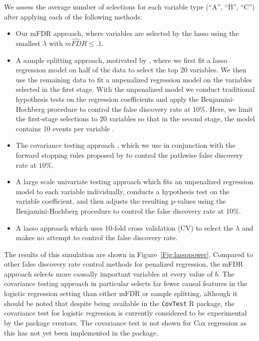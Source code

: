 We assess the average number of selections for each variable type (``A'', ``B'', ``C'') after applying each of the following methods:
\begin{itemize}
\item Our mFDR approach, where variables are selected by the lasso using the smallest $\lambda$ with $\widehat{mFDR} \leq .1$.
\item A sample splitting approach, motivated by \citet{Sample_Splitting}, where we first fit a lasso regression model on half of the data to select the top 20 variables. We then use the remaining data to fit a unpenalized regression model on the variables selected in the first stage. With the unpenalized model we conduct traditional hypothesis tests on the regression coefficients and apply the Benjamini-Hochberg procedure \citep{BH_1995} to control the false discovery rate at $10\%$. Here, we limit the first-stage selections to 20 variables so that in the second stage, the model contains 10 events per variable \citep{peduzzi_epv}.
\item The covariance testing approach \citep{CovTest}, which we use in conjunction with the forward stopping rules proposed by \citet{GSell2016} to control the pathwise false discovery rate at $10\%$. 
\item A large scale univariate testing approach which fits an unpenalized regression model to each variable individually, conducts a hypothesis test on the variable coefficient, and then adjusts the resulting p-values using the Benjamini-Hochberg procedure to control the false discovery rate at $10\%$.
\item A lasso approach which uses 10-fold cross validation (CV) to select the $\lambda$ and makes no attempt to control the false discovery rate.
\end{itemize}

The results of this simulation are shown in Figure~\ref{Fig:lassopower}.  Compared to other false discovery rate control methods for penalized regression, the mFDR approach selects more causally important variables at every value of $b$. The covariance testing approach in particular selects far fewer causal features in the logistic regression setting than either mFDR or sample splitting, although it should be noted that despite being available in the {\tt CovTest} R package, the covariance test for logistic regression is currently considered to be experimental by the package creators.  The covariance test is not shown for Cox regression as this has not yet been implemented in the package.

